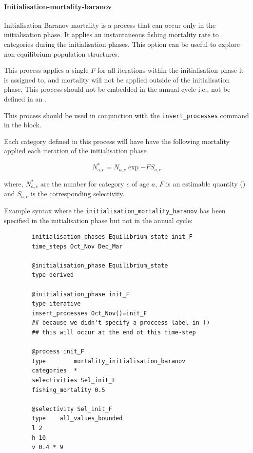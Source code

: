 \paragraph{Initialisation-mortality-baranov}\label{sec:Process-MortalityInitialisationBaranov}

Initialisation Baranov mortality  is a process that can occur only in the initialisation phase. It applies an instantaneous fishing mortality rate to categories during the initialisation phases. This option can be useful to explore non-equilibrium population structures.

This process applies a single \(F\) for all iterations within the initialisation phase it is assigned to, and mortality will not be applied outside of the initialisation phase. This process should not be embedded in the annual cycle i.e., not be defined in an .

This process should be used in conjunction with the \texttt{insert\_processes} command in the  block.

Each category defined in this process will have have the following mortality applied each iteration of the initialisation phase

\[
N^*_{a,c}  = N_{a,c} \exp{-F S_{a,c}}
\]

where, \(N^*_{a,c}\) are the number for category \(c\) of age \(a\), \(F\) is an estimable quantity () and \(S_{a,c}\) is the corresponding selectivity.

Example syntax where the \texttt{initialisation\_mortality\_baranov} has been specified in the initialisation phase but not in the annual cycle:

{\small{\begin{verbatim}
		initialisation_phases Equilibrium_state init_F
		time_steps Oct_Nov Dec_Mar
		
		@initialisation_phase Equilibrium_state
		type derived
		
		@initialisation_phase init_F
		type iterative
		insert_processes Oct_Nov()=init_F 
		## because we didn't specify a proccess label in ()
		## this will occur at the end ot this time-step
		
		@process init_F
		type 		mortality_initialisation_baranov
		categories	*
		selectivities Sel_init_F
		fishing_mortality 0.5
		
		@selectivity Sel_init_F
		type 	all_values_bounded 
		l 2
		h 10
		v 0.4 * 9
		\end{verbatim}}}

